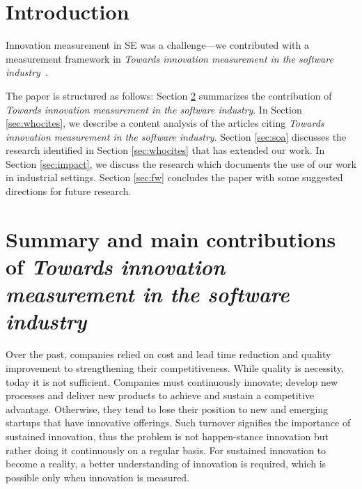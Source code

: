 \documentclass[sigplan]{acmart}
\newcommand{\theArticle}{\textit{Towards innovation measurement in the software industry}}
\begin{document}



\maketitle


\section{Introduction}\label{sec:intro}
Innovation measurement in SE was a challenge---we contributed with a measurement framework in \theArticle~\cite{EdisonAT13}. 

The paper is structured as follows: Section \ref{sec:sumpaper} summarizes the contribution of \theArticle. In Section \ref{sec:whocites}, we describe a content analysis of the articles citing \theArticle. Section \ref{sec:soa} discusses the research identified in Section \ref{sec:whocites} that has extended our work. In Section \ref{sec:impact}, we discuss the research which documents the use of our work in industrial settings. Section \ref{sec:fw} concludes the paper with some suggested directions for future research.

\section{Summary and main contributions of \theArticle}\label{sec:sumpaper}
Over the past, companies relied on cost and lead time reduction and quality improvement to strengthening their competitiveness. While quality is necessity, today it is not sufficient. Companies must continuously innovate; develop new processes and deliver new products to achieve and sustain a competitive advantage. Otherwise, they tend to lose their position to new and emerging startups that have innovative offerings. Such turnover signifies the importance of sustained innovation, thus the problem is not happen-stance innovation but rather doing it continuously on a regular basis. For sustained innovation to become a reality, a better understanding of innovation is required, which is possible only when innovation is measured.
\end{document}
